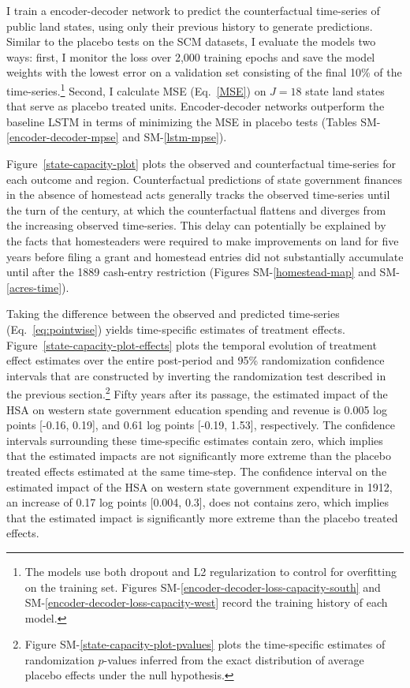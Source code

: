 \documentclass[hidelinks,12pt]{article}
\begin{document}
I train a encoder-decoder network to predict the counterfactual time-series of public land states, using only their previous history to generate predictions. Similar to the placebo tests on the SCM datasets, I evaluate the models two ways: first, I monitor the loss over 2,000 training epochs and save the model weights with the lowest error on a validation set consisting of the final 10\% of the time-series.\footnote{The models use both dropout and L2 regularization to control for overfitting on the training set. Figures SM-\ref{encoder-decoder-loss-capacity-south} and SM-\ref{encoder-decoder-loss-capacity-west} record the training history of each model.} Second, I calculate MSE (Eq.~\ref{MSE}) on $J=18$ state land states that serve as placebo treated units. Encoder-decoder networks outperform the baseline LSTM in terms of minimizing the MSE in placebo tests (Tables SM-\ref{encoder-decoder-mpse} and SM-\ref{lstm-mpse}).

Figure~\ref{state-capacity-plot} plots the observed and counterfactual time-series for each outcome and region. Counterfactual predictions of state government finances in the absence of homestead acts generally tracks the observed time-series until the turn of the century, at which the counterfactual flattens and diverges from the increasing observed time-series. This delay can potentially be explained by the facts that homesteaders were required to make improvements on land for five years before filing a grant and homestead entries did not substantially accumulate until after the 1889 cash-entry restriction (Figures SM-\ref{homestead-map} and SM-\ref{acres-time}). 

Taking the difference between the observed and predicted time-series (Eq.~\ref{eq:pointwise}) yields time-specific estimates of treatment effects. Figure~\ref{state-capacity-plot-effects} plots the temporal evolution of treatment effect estimates over the entire post-period and 95\% randomization confidence intervals that are constructed by inverting the randomization test described in the previous section.\footnote{Figure SM-\ref{state-capacity-plot-pvalues} plots the time-specific estimates of randomization $p$-values inferred from the exact distribution of average placebo effects under the null hypothesis.} Fifty years after its passage, the estimated impact of the HSA on western state government education spending and revenue is 0.005 log points [-0.16, 0.19], and 0.61 log points [-0.19, 1.53], respectively. The confidence intervals surrounding these time-specific estimates contain zero, which implies that the estimated impacts are not significantly more extreme than the placebo treated effects estimated at the same time-step. The confidence interval on the estimated impact of the HSA on western state government expenditure in 1912, an increase of 0.17 log points [0.004, 0.3], does not contains zero, which implies that the estimated impact is significantly more extreme than the placebo treated effects. 
\end{document}
